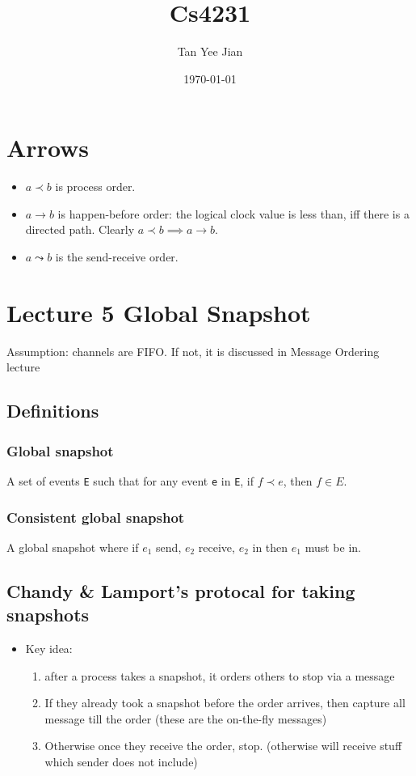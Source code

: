\documentclass[11pt]{article}
\author{Tan Yee Jian}
\date{\today}
\title{Cs4231}
\begin{document}
\maketitle
\tableofcontents


\section{Arrows}
\label{sec:org1881088}
\begin{itemize}
  \item \(a\prec b\) is process order.
  \item \(a\to b\) is happen-before order: the logical clock value is less than, iff
        there is a directed path. Clearly \(a\prec b\implies a\to b\).
  \item \(a\leadsto b\) is the send-receive order.
\end{itemize}
\section{Lecture 5 Global Snapshot}
\label{sec:orgeba08ca}
Assumption: channels are FIFO. If not, it is discussed in Message Ordering
lecture
\subsection{Definitions}
\label{sec:orgcdef94f}
\subsubsection{Global snapshot}
\label{sec:orgb685326}
A set of events \texttt{E} such that for any event \texttt{e} in \texttt{E}, if \(f\prec e\), then
\(f\in E\).
\subsubsection{Consistent global snapshot}
\label{sec:orgea00abd}
A global snapshot where if \(e_1\) send, \(e_2\) receive, \(e_2\) in then \(e_1\) must be in.
\subsection{Chandy \& Lamport's protocal for taking snapshots}
\label{sec:orgf0defc2}
\begin{itemize}
  \item Key idea:
        \begin{enumerate}
          \item after a process takes a snapshot, it orders others to stop via a message
          \item If they already took a snapshot before the order arrives, then capture all
                message till the order (these are the on-the-fly messages)
          \item Otherwise once they receive the order, stop. (otherwise will receive stuff
                which sender does not include)
        \end{enumerate}
\end{itemize}
\end{document}
